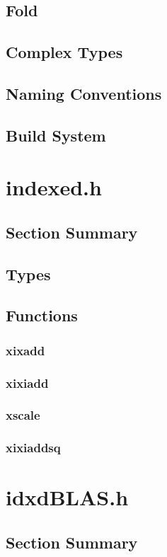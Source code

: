 \documentclass[12pt]{article}
\theoremstyle{definition}
\numberwithin{equation}{section}
\begin{document}
  \subsection{Fold}
  \subsection{Complex Types}
  \subsection{Naming Conventions}
  \subsection{Build System}
\section{indexed.h}
  \subsection{Section Summary}
  \subsection{Types}
  \subsection{Functions}
    \subsubsection{xixadd}
    \subsubsection{xixiadd}
    \subsubsection{xscale}
    \subsubsection{xixiaddsq}
\section{idxdBLAS.h}
  \subsection{Section Summary}
\end{document}
